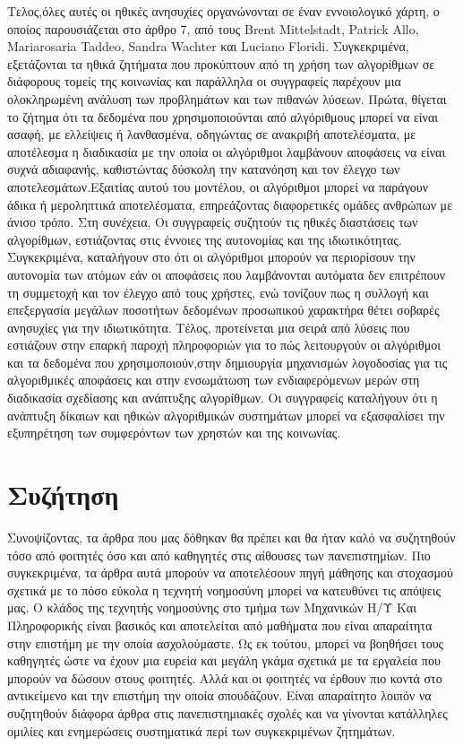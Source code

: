 \documentclass{report}
\begin{document}
\newline 
Τελος,όλες αυτές οι ηθικές ανησυχίες οργανώνονται σε έναν εννοιολογικό χάρτη, ο οποίος παρουσιάζεται στο άρθρο 7, από τους Brent Mittelstadt, Patrick Allo, Mariarosaria Taddeo, Sandra Wachter και Luciano Floridi. Συγκεκριμένα, εξετάζονται τα ηθικά ζητήματα που προκύπτουν από τη χρήση των αλγορίθμων σε διάφορους τομείς της κοινωνίας και παράλληλα οι συγγραφείς παρέχουν μια ολοκληρωμένη ανάλυση των προβλημάτων και των πιθανών λύσεων. Πρώτα, θίγεται το ζήτημα ότι τα δεδομένα που χρησιμοποιούνται από αλγόριθμους μπορεί να είναι ασαφή, με ελλείψεις ή λανθασμένα, οδηγώντας σε ανακριβή αποτελέσματα, με αποτέλεσμα η διαδικασία με την οποία οι αλγόριθμοι λαμβάνουν αποφάσεις να είναι συχνά αδιαφανής, καθιστώντας δύσκολη την κατανόηση και τον έλεγχο των αποτελεσμάτων.Εξαιτίας αυτού του μοντέλου, οι αλγόριθμοι μπορεί να παράγουν άδικα ή μεροληπτικά αποτελέσματα, επηρεάζοντας διαφορετικές ομάδες ανθρώπων με άνισο τρόπο. Στη συνέχεια, Οι συγγραφείς συζητούν τις ηθικές διαστάσεις των αλγορίθμων, εστιάζοντας στις έννοιες της αυτονομίας και της ιδιωτικότητας.
Συγκεκριμένα, καταλήγουν στο ότι οι αλγόριθμοι μπορούν να περιορίσουν την αυτονομία των ατόμων εάν οι αποφάσεις που λαμβάνονται αυτόματα δεν επιτρέπουν τη συμμετοχή και τον έλεγχο από τους χρήστες, ενώ τονίζουν πως η συλλογή και επεξεργασία μεγάλων ποσοτήτων δεδομένων προσωπικού χαρακτήρα θέτει σοβαρές ανησυχίες για την ιδιωτικότητα. Τέλος, προτείνεται μια σειρά από λύσεις που εστιάζουν στην επαρκή παροχή πληροφοριών για το πώς λειτουργούν οι αλγόριθμοι και τα δεδομένα που χρησιμοποιούν,στην δημιουργία μηχανισμών λογοδοσίας για τις αλγοριθμικές αποφάσεις και στην ενσωμάτωση των ενδιαφερόμενων μερών στη διαδικασία σχεδίασης και ανάπτυξης αλγορίθμων. Οι συγγραφείς καταλήγουν ότι η ανάπτυξη δίκαιων και ηθικών αλγοριθμικών συστημάτων μπορεί να εξασφαλίσει την εξυπηρέτηση των συμφερόντων των χρηστών και της κοινωνίας.

\section{Συζήτηση}
Συνοψίζοντας, τα άρθρα που μας δόθηκαν θα πρέπει και θα ήταν καλό να συζητηθούν τόσο από φοιτητές όσο και από καθηγητές στις αίθουσες των πανεπιστημίων. Πιο συγκεκριμένα, τα άρθρα αυτά μπορούν να αποτελέσουν πηγή μάθησης και στοχασμού σχετικά με το πόσο εύκολα η τεχνητή νοημοσύνη μπορεί να κατευθύνει τις απόψεις μας. Ο κλάδος της τεχνητής νοημοσύνης στο τμήμα των Μηχανικών Η/Υ Και Πληροφορικής είναι βασικός και αποτελείται από μαθήματα που είναι απαραίτητα στην επιστήμη με την οποία ασχολούμαστε. Ως εκ τούτου, μπορεί να βοηθήσει τους καθηγητές ώστε να έχουν μια ευρεία και μεγάλη γκάμα σχετικά με τα εργαλεία που μπορούν να δώσουν στους φοιτητές. Αλλά και οι φοιτητές να έρθουν πιο κοντά στο αντικείμενο και την επιστήμη την οποία σπουδάζουν. Είναι απαραίτητο λοιπόν να συζητηθούν διάφορα άρθρα στις πανεπιστημιακές σχολές και να γίνονται κατάλληλες ομιλίες και ενημερώσεις συστηματικά περί των συγκεκριμένων ζητημάτων.
\end{document}
